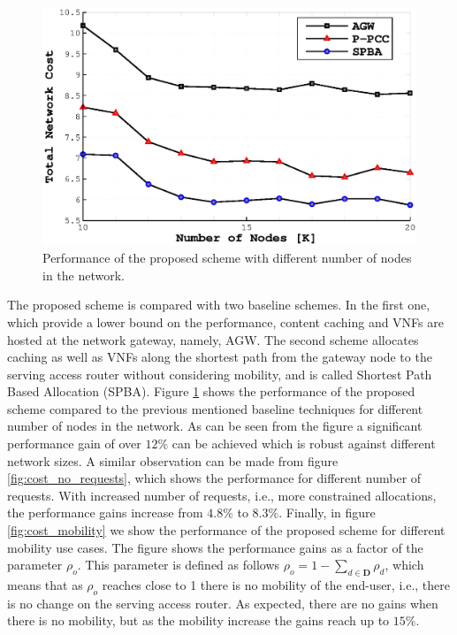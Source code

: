 \documentclass[journal]{IEEEtran}
\begin{document}
  \begin{figure}
    \includegraphics[width=1.1\columnwidth,trim=1.1cm 0.5cm 0cm 0.8cm]{mc_ppcc_naive_K_1020_final.eps}
    \caption{Performance of the proposed scheme with different number of nodes in the network.}
    \label{fig:cost_no_nodes}
  \end{figure}
  The proposed scheme is compared with two baseline schemes. In the first one, which provide a lower bound on the performance, content caching and VNFs are hosted at the network gateway, namely, AGW. The second scheme allocates caching as well as VNFs along the shortest path from the gateway node to the serving access router without considering mobility, and is called Shortest Path Based Allocation (SPBA). Figure \ref{fig:cost_no_nodes} shows the performance of the proposed scheme compared to the previous mentioned baseline techniques for different number of nodes in the network. As can be seen from the figure a significant performance gain of over $12\%$ can be achieved which is robust against different network sizes. A similar observation can be made from figure \ref{fig:cost_no_requests}, which shows the performance for different number of requests. With increased  number of requests, i.e., more constrained allocations, the performance gains increase from $4.8\%$ to $8.3\%$. Finally, in figure \ref{fig:cost_mobility} we show the performance of the proposed scheme for different mobility use cases. The figure shows the performance gains as a factor of the parameter $\rho_{o}$. This parameter is defined as follows $\rho_{o} = 1 -  \sum_{d \in \mathbf{D}} \rho_d$, which means that as $\rho_{o}$ reaches close to 1 there is no mobility of the end-user, i.e., there is no change on the serving access router. As expected, there are no gains when there is no mobility, but as the mobility increase the gains reach up to $15\%$.
\end{document}
